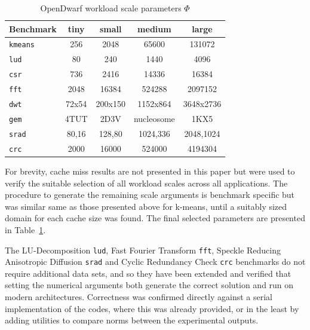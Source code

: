 \documentclass[../document.tex]{subfiles}
\begin{document}

\begin{table}[t]
\centering
\begin{threeparttable}
    \centering
    \caption{OpenDwarf workload scale parameters $\Phi$}
    \begin{tabular}{l|c|c|c|c}
        \bf Benchmark         & \bf tiny   & small  & medium     & large\\\hline
        {\tt kmeans}          & 256        & 2048   & 65600      & 131072\\
        {\tt lud}             & 80         & 240    & 1440       & 4096\\
        {\tt csr}             & 736        & 2416   & 14336      & 16384\\
        {\tt fft}             & 2048       & 16384  & 524288     & 2097152\\
        {\tt dwt}             & 72x54      & 200x150& 1152x864   & 3648x2736\\       
        {\tt gem}             & 4TUT       & 2D3V   & nucleosome & 1KX5\\
        {\tt srad}            & 80,16      & 128,80 & 1024,336   & 2048,1024\\
        {\tt crc}             & 2000       & 16000  & 524000     & 4194304\\
    \end{tabular}
    \label{tab:problem_sizes}
\end{threeparttable}
\end{table}

For brevity, cache miss results are not presented in this paper but were used to verify the suitable selection of all workload scales across all applications.
The procedure to generate the remaining scale arguments is benchmark specific but was similar same as those presented above for k-means, until a suitably sized domain for each cache size was found.
The final selected parameters are presented in Table~\ref{tab:problem_sizes}.

The LU-Decomposition {\tt lud}, Fast Fourier Transform {\tt fft}, Speckle Reducing Anisotropic Diffusion {\tt srad} and Cyclic Redundancy Check {\tt crc} benchmarks do not require additional data sets, and so they have been extended and verified that setting the numerical arguments both generate the correct solution and run on modern architectures.
Correctness was confirmed directly against a serial implementation of the codes, where this was already provided, or in the least by adding utilities to compare norms between the experimental outputs.
\end{document}
